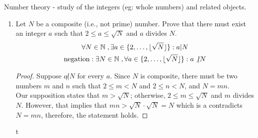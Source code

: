 \documentclass[11pt]{article}
\begin{document}

\begin{definition}
Number theory - study of the integers (eg: whole numbers) and related objects.
\end{definition}

\begin{enumerate}
    \item Let $N$ be a composite (i.e., not prime) number. Prove that there must exist an integer $a$ such that $2 \leq a \leq \sqrt{N}$ and $a$ divides $N$.
    \begin{gather}
        \forall N \in \mathbb{N}\hspace{1.0mm}, \exists a \in \{2, \ldots, \lfloor \sqrt{N} \rfloor\} : a | N \\
        \text{negation}: \exists N \in \mathbb{N}\hspace{1.0mm}, \forall a \in \{2, \ldots, \lfloor \sqrt{N} \rfloor\} : a \not | N
    \end{gather}
    \begin{proof}
        Suppose $a \not | N$ for every $a$. Since $N$ is composite, there must be two numbers $m$ and $n$ such that $2 \leq m < N$ and $2 \leq n  < N$, and $N = mn$. \\

        Our supposition states that $m > \sqrt{N}$; otherwise, $2 \leq m \leq \sqrt{N}$ and $m$ divides $N$. However, that implies that $mn > \sqrt{N} \cdot \sqrt{N} = N$ which is a contradicts $N = mn$, therefore, the statement holds.
    \end{proof}t
\end{enumerate}
\end{document}

